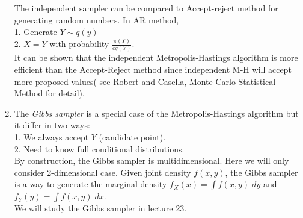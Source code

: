 \documentclass[12pt,twocolumn]{article} %
\begin{document}
\begin{enumerate}
The independent sampler can be compared to Accept-reject method for generating random numbers. In AR method,\\
1. Generate $Y \sim q(y)$\\
2. $X= Y$ with probability $\frac{\pi(Y)}{cq(Y)}$.\\
It can be shown that the independent Metropolis-Hastings algorithm is more efficient than the Accept-Reject method since independent M-H will accept more proposed values( see Robert and Casella, Monte Carlo Statistical Method for detail). \\


\item The {\em Gibbs sampler} is a special case of the Metropolis-Hastings algorithm but it differ in two ways:\\
1. We always accept $Y$ (candidate point). \\
2. Need to know full conditional distributions.\\
By construction, the Gibbs sampler is multidimensional. Here we will only consider 2-dimensional case. Given joint density $f(x,y)$, the Gibbs sampler is a way to generate the marginal density $f_X(x) = \int f(x,y) \; dy$ and $f_Y(y)= \int f(x,y) \; dx$.\\

We will study the Gibbs sampler in lecture 23.
  
\end{enumerate}
\end{document}
